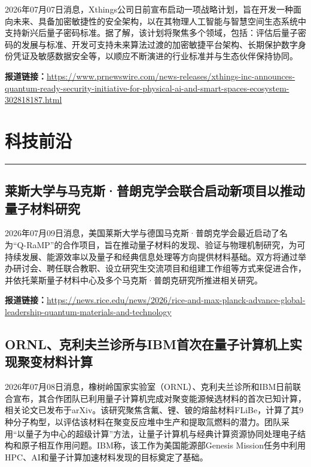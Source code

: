 \documentclass[12pt,a4paper]{ctexart}
\begin{document}
2026年07月07日消息，Xthings公司日前宣布启动一项战略计划，旨在开发一种面向未来、具备加密敏捷性的安全架构，以在其物理人工智能与智慧空间生态系统中支持新兴后量子密码标准。据了解，该计划将聚焦多个领域，包括：评估后量子密码的发展与标准、开发可支持未来算法过渡的加密敏捷平台架构、长期保护数字身份凭证及敏感数据安全等，以顺应不断演进的行业标准并与生态伙伴保持协同。

\noindent\textbf{报道链接：}\url{https://www.prnewswire.com/news-releases/xthings-inc-announces-quantum-ready-security-initiative-for-physical-ai-and-smart-spaces-ecosystem-302818187.html}


\newpage
\section{科技前沿}
\vspace{-0.5em}
\noindent\rule{\linewidth}{1.5pt}

\subsection{ 莱斯大学与马克斯·普朗克学会联合启动新项目以推动量子材料研究 }

2026年07月09日消息，美国莱斯大学与德国马克斯·普朗克学会最近启动了名为“Q-RaMP”的合作项目，旨在推动量子材料的发现、验证与物理机制研究，为可持续发展、能源效率以及量子和经典信息处理等方向提供材料基础。双方将通过举办研讨会、聘任联合教职、设立研究生交流项目和组建工作组等方式来促进合作，并依托莱斯量子材料中心及多个马克斯·普朗克研究所推进相关研究。

\noindent\textbf{报道链接：}\url{https://news.rice.edu/news/2026/rice-and-max-planck-advance-global-leadership-quantum-materials-and-technology}

\subsection{ ORNL、克利夫兰诊所与IBM首次在量子计算机上实现聚变材料计算 }

2026年07月08日消息，橡树岭国家实验室（ORNL）、克利夫兰诊所和IBM日前联合宣布，其合作团队已利用量子计算机完成对聚变能源候选材料的首次已知计算，相关论文已发布于arXiv。该研究聚焦含氟、锂、铍的熔盐材料FLiBe，计算了其9种分子构型，以评估该材料在聚变反应堆中生产和提取氚燃料的潜力。团队采用“以量子为中心的超级计算”方法，让量子计算机与经典计算资源协同处理电子结构和原子相互作用问题。IBM称，该工作为美国能源部Genesis Mission任务中利用HPC、AI和量子计算加速材料发现的目标奠定了基础。
\end{document}
